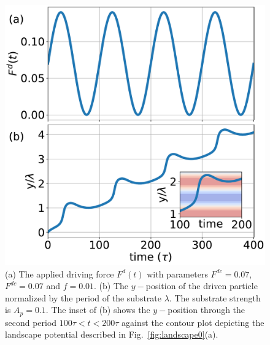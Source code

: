 \documentclass[twocolumn,preprintnumbers,amsmath,amssymb,aps,prx]{revtex4}
\begin{document}
\begin{figure} %
\centering
\includegraphics[width=\columnwidth]{fig2.pdf}
\caption{(a) The applied driving force $F^d(t)$ %
  with parameters $F^{dc} = 0.07$, $F^{dc} = 0.07$ and $f=0.01$.
  (b) 
  The $y-$position of the driven particle
  normalized by the period of the substrate $\lambda$.
  The substrate strength is $A_p=0.1$.
  The inset of (b) shows
  the $y-$position
  through the second period $100\tau<t<200\tau$
  against the contour plot depicting
  the landscape potential described in Fig.~\ref{fig:landscape0}(a).
  }
\label{fig:0}
\end{figure}
\end{document}
